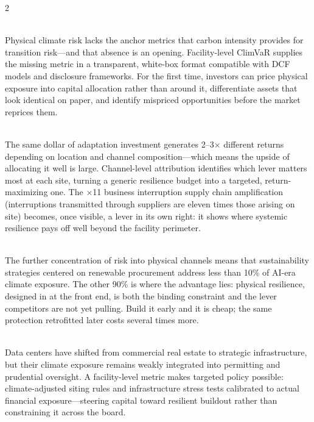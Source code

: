 \begin{multicols}{2}
\setlength{\parskip}{1pt}

\\[0pt]
Physical climate risk lacks the anchor metrics that carbon intensity provides for transition risk---and that absence is an opening. Facility-level ClimVaR supplies the missing metric in a transparent, white-box format compatible with DCF models and disclosure frameworks. For the first time, investors can price physical exposure into capital allocation rather than around it, differentiate assets that look identical on paper, and identify mispriced opportunities before the market reprices them.

\vspace{1mm}

\\[0pt]
The same dollar of adaptation investment generates 2--3$\times$ different returns depending on location and channel composition---which means the upside of allocating it well is large. Channel-level attribution identifies which lever matters most at each site, turning a generic resilience budget into a targeted, return-maximizing one. The $\times$11 business interruption supply chain amplification (interruptions transmitted through suppliers are eleven times those arising on site) becomes, once visible, a lever in its own right: it shows where systemic resilience pays off well beyond the facility perimeter.

\vspace{1mm}

\\[0pt]
The further concentration of risk into physical channels means that sustainability strategies centered on renewable procurement address less than 10\% of AI-era climate exposure. The other 90\% is where the advantage lies: physical resilience, designed in at the front end, is both the binding constraint and the lever competitors are not yet pulling. Build it early and it is cheap; the same protection retrofitted later costs several times more.

\vspace{1mm}

\\[0pt]
Data centers have shifted from commercial real estate to strategic infrastructure, but their climate exposure remains weakly integrated into permitting and prudential oversight. A facility-level metric makes targeted policy possible: climate-adjusted siting rules and infrastructure stress tests calibrated to actual financial exposure---steering capital toward resilient buildout rather than constraining it across the board.


\end{multicols}
